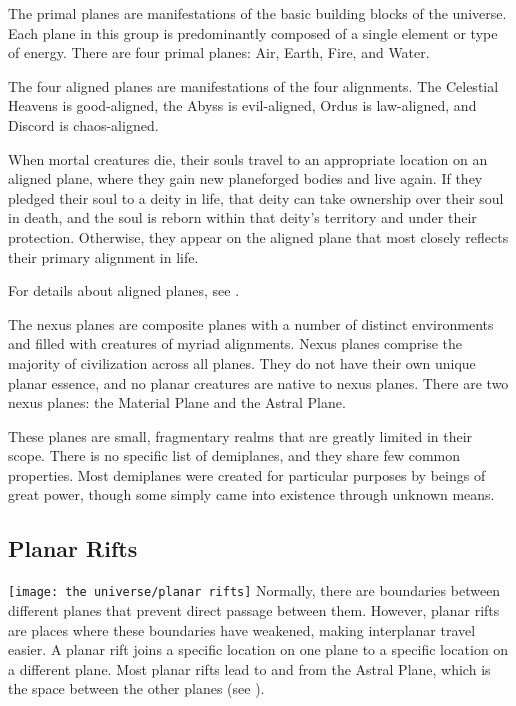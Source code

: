          The primal planes are manifestations of the basic building blocks of the universe.
        Each plane in this group is predominantly composed of a single element or type of energy.
        There are four primal planes: Air, Earth, Fire, and Water.

         The four aligned planes are manifestations of the four alignments.
        The Celestial Heavens is good-aligned, the Abyss is evil-aligned, Ordus is law-aligned, and Discord is chaos-aligned.

        When mortal creatures die, their souls travel to an appropriate location on an aligned plane, where they gain new planeforged bodies and live again.
        If they pledged their soul to a deity in life, that deity can take ownership over their soul in death, and the soul is reborn within that deity's territory and under their protection.
        Otherwise, they appear on the aligned plane that most closely reflects their primary alignment in life.

        For details about aligned planes, see .

         The nexus planes are composite planes with a number of distinct environments and filled with creatures of myriad alignments.
        Nexus planes comprise the majority of civilization across all planes.
        They do not have their own unique planar essence, and no planar creatures are native to nexus planes.
        There are two nexus planes: the Material Plane and the Astral Plane.

         These planes are small, fragmentary realms that are greatly limited in their scope.
        There is no specific list of demiplanes, and they share few common properties.
        Most demiplanes were created for particular purposes by beings of great power, though some simply came into existence through unknown means.

    \subsection{Planar Rifts}\label{Planar Rifts}
        \texttt{[image: the universe/planar rifts]}
        Normally, there are boundaries between different planes that prevent direct passage between them.
        However, planar rifts are places where these boundaries have weakened, making interplanar travel easier.
        A planar rift joins a specific location on one plane to a specific location on a different plane.
        Most planar rifts lead to and from the Astral Plane, which is the space between the other planes (see ).

